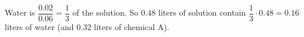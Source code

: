 Water is $\dfrac{0.02}{0.06}=\dfrac{1}{3}$ of the solution. So $0.48$ liters of solution contain $\dfrac{1}{3}\cdot0.48=\boxed{0.16}$ liters of water (and $0.32$ liters of chemical A).
